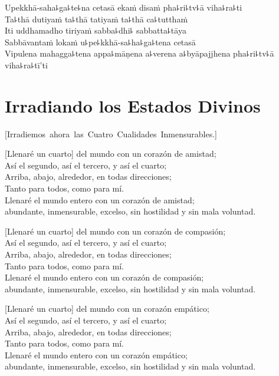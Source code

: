Upekkhā-saha꜕ga꜕te꜕na cetasā ekaṁ disaṁ pha꜕ri꜕tv꜕ā viha꜕ra꜕ti\\
Ta꜕thā dutiyaṁ ta꜕thā tatiyaṁ ta꜕thā ca꜕tutthaṁ\\
Iti uddhamadho tiriyaṁ sabba꜕dhi꜕ sabbatta꜕tāya\\
Sabbāvantaṁ lokaṁ u꜕pe꜕kkhā-sa꜕ha꜕ga꜕tena cetasā\\
Vipulena mahagga꜕tena appa꜕māṇena a꜕verena a꜕byāpajjhena pha꜕ri꜕tv꜕ā viha꜕ra꜕tī'ti

\chapter[Irradiando los Estados Divinos]{Irradiando los Estados Divinos}

\enlargethispage{\baselineskip}


\begin{leader}
  \vspace*{-\baselineskip}
  \mbox{[Irradiemos ahora las Cuatro Cualidades Inmensurables.]}
\end{leader}

[Llenaré un cuarto] del mundo con un corazón de amistad;\\
Así el segundo, así el tercero, y así el cuarto;\\
Arriba, abajo, alrededor, en todas direcciones;\\
Tanto para todos, como para mí.\\
Llenaré el mundo entero con un corazón de amistad;\\ abundante, inmensurable, excelso, sin hostilidad y sin mala voluntad.

[Llenaré un cuarto] del mundo con un corazón de compasión;\\
Así el segundo, así el tercero, y así el cuarto;\\
Arriba, abajo, alrededor, en todas direcciones;\\
Tanto para todos, como para mí.\\
Llenaré el mundo entero con un corazón de compasión;\\ abundante, inmensurable, excelso, sin hostilidad y sin mala voluntad.

[Llenaré un cuarto] del mundo con un corazón empático;\\
Así el segundo, así el tercero, y así el cuarto;\\
Arriba, abajo, alrededor, en todas direcciones;\\
Tanto para todos, como para mí.\\
Llenaré el mundo entero con un corazón empático;\\ abundante, inmensurable, excelso, sin hostilidad y sin mala voluntad.

